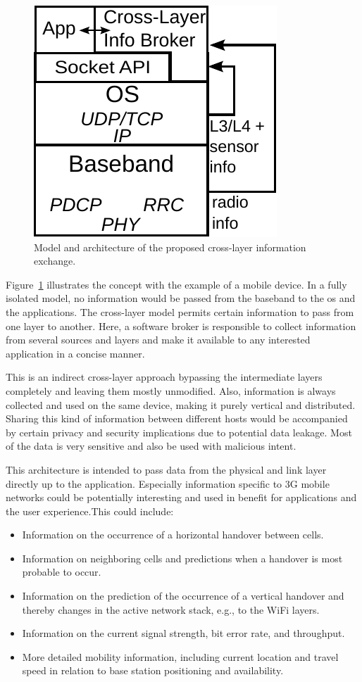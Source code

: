 \begin{figure}[htb]
	\centering
	\includegraphics{images/cross-layer-model.pdf}
	\caption{Model and architecture of the proposed cross-layer information exchange.}
\label{c5:fig:crosslayer-model}
\end{figure}

Figure~\ref{c5:fig:crosslayer-model} illustrates the concept with the example of a mobile device. In a fully isolated model, no information would be passed from the baseband to the \gls{os} and the applications. The cross-layer model permits certain information to pass from one layer to another. Here, a software broker is responsible to collect information from several sources and layers and make it available to any interested application in a concise manner. 

This is an indirect cross-layer approach bypassing the intermediate layers completely and leaving them mostly unmodified. Also, information is always collected and used on the same device, making it purely vertical and distributed. Sharing this kind of information between different hosts would be accompanied by certain privacy and security implications due to potential data leakage. Most of the data is very sensitive and also be used with malicious intent.

This architecture is intended to pass data from the physical and link layer directly up to the application. Especially information specific to \gls{3G} mobile networks could be potentially interesting and used in benefit for applications and the user experience.This could include:

\begin{itemize}
	\item Information on the occurrence of a horizontal handover between cells.
	\item Information on neighboring cells and predictions when a handover is most probable to occur.
	\item Information on the prediction of the occurrence of a vertical handover and thereby changes in the active network stack, e.g., to the WiFi layers.
	\item Information on the current signal strength, bit error rate, and throughput.
	\item More detailed mobility information, including current location and travel speed in relation to base station positioning and availability.
\end{itemize}

